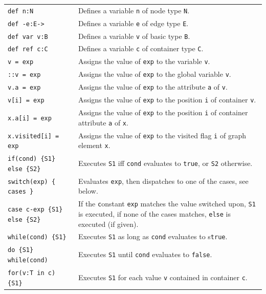 \begin{table}[htbp]
\begin{minipage}{\linewidth} \renewcommand{\footnoterule}{} 
\begin{tabularx}{\linewidth}{|lX|}
\hline
\texttt{def n:N}	& Defines a variable \texttt{n} of node type \texttt{N}.\\
\texttt{def -e:E->}	& Defines a variable \texttt{e} of edge type \texttt{E}.\\
\texttt{def var v:B}	& Defines a variable \texttt{v} of basic type \texttt{B}.\\
\texttt{def ref c:C}	& Defines a variable \texttt{c} of container type \texttt{C}.\\
\hline
\texttt{v = exp} & Assigns the value of \texttt{exp} to the variable \texttt{v}.\\
\texttt{::v = exp} & Assigns the value of \texttt{exp} to the global variable \texttt{v}.\\
\texttt{v.a = exp} & Assigns the value of \texttt{exp} to the attribute \texttt{a} of \texttt{v}.\\
\texttt{v[i] = exp} & Assigns the value of \texttt{exp} to the position \texttt{i} of container \texttt{v}.\\
\texttt{x.a[i] = exp} & Assigns the value of \texttt{exp} to the position \texttt{i} of container attribute \texttt{a} of \texttt{x}.\\
\texttt{x.visited[i] = exp} & Assigns the value of \texttt{exp} to the visited flag \texttt{i} of graph element \texttt{x}.\\
\hline
\texttt{if(cond) \{S1\} else \{S2\}} & Executes \texttt{S1} iff \texttt{cond} evaluates to \texttt{true}, or \texttt{S2} otherwise.\\
\texttt{switch(exp) \{ cases \}} & Evaluates \texttt{exp}, then dispatches to one of the cases, see below.\\
\texttt{case c-exp \{S1\} else \{S2\}} & If the \texttt{c}onstant \texttt{exp} matches the value switched upon, \texttt{S1} is executed, if none of the cases matches, \texttt{else} is executed (if given).\\
\texttt{while(cond) \{S1\} } & Executes \texttt{S1} as long as \texttt{cond} evaluates to s\texttt{true}.\\
\texttt{do \{S1\} while(cond) } & Executes \texttt{S1} until \texttt{cond} evaluates to \texttt{false}.\\
\texttt{for(v:T in c) \{S1\} } & Executes \texttt{S1} for each value \texttt{v} contained in container \texttt{c}.\\

\end{tabularx}
\end{minipage}
\end{table}
